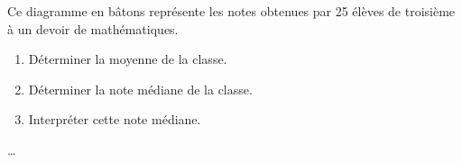 \begin{exercice*}
    Ce diagramme en bâtons représente les notes obtenues par \num{25} élèves de troisième à un devoir de mathématiques.
    \par\smallskip
    \begin{enumerate}
        \item Déterminer la moyenne de la classe.
        \item Déterminer la note médiane de la classe.
        \item Interpréter cette note médiane.
    \end{enumerate}
\end{exercice*}
\begin{corrige}
    \dots
\end{corrige}

